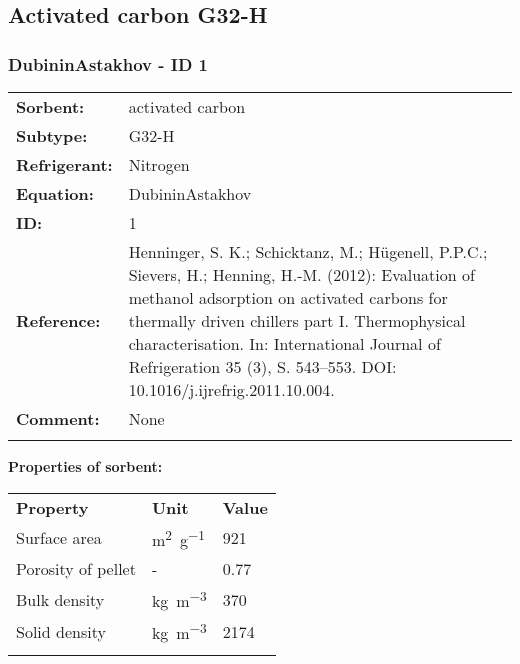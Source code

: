\subsection{Activated carbon G32-H}
%
\subsubsection{DubininAstakhov - ID 1}
%
\begin{tabular}[l]{|lp{11.5cm}|}
\hline
\addlinespace

\textbf{Sorbent:} & activated carbon \\
\textbf{Subtype:} & G32-H \\
\textbf{Refrigerant:} & Nitrogen \\
\textbf{Equation:} & DubininAstakhov \\
\textbf{ID:} & 1 \\
\textbf{Reference:} & Henninger, S. K.; Schicktanz, M.; Hügenell, P.P.C.; Sievers, H.; Henning, H.-M. (2012): Evaluation of methanol adsorption on activated carbons for thermally driven chillers part I. Thermophysical characterisation. In: International Journal of Refrigeration 35 (3), S. 543–553. DOI: 10.1016/j.ijrefrig.2011.10.004. \\
\textbf{Comment:} & None \\

\addlinespace
\hline
\end{tabular}
\newline

\textbf{Properties of sorbent:}
\newline
%
\begin{longtable}[l]{lll}
\toprule
\addlinespace
\textbf{Property} & \textbf{Unit} & \textbf{Value} \\
\addlinespace
\midrule
\endhead
\bottomrule
\endfoot
\bottomrule
\endlastfoot
\addlinespace

Surface area & \si{\square\meter\per\gram} & 921\\
Porosity of pellet & - & 0.77\\
Bulk density & \si{\kilogram\per\cubic\meter} & 370\\
Solid density & \si{\kilogram\per\cubic\meter} & 2174\\

\addlinespace\end{longtable}

